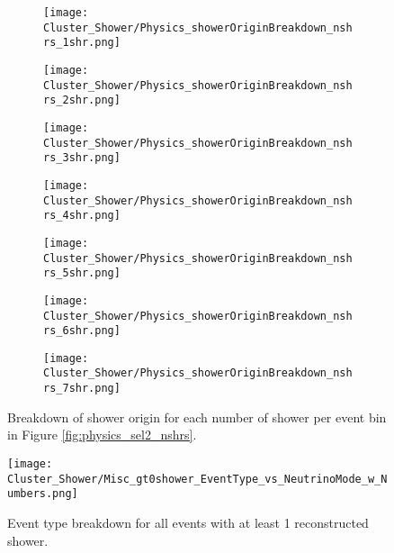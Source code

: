 \documentclass{article}
\begin{document}
\begin{figure}[t!]
\centering
  \begin{subfigure}[t]{0.25\textwidth}
    \centering
\texttt{[image: Cluster\_Shower/Physics\_showerOriginBreakdown\_nshrs\_1shr.png]}
  \caption{ }
  \end{subfigure} 
  \hspace{4mm}
  \begin{subfigure}[t]{0.25\textwidth}
    \centering
\texttt{[image: Cluster\_Shower/Physics\_showerOriginBreakdown\_nshrs\_2shr.png]}
  \caption{ }
  \end{subfigure} 
  \hspace{4mm}
  \begin{subfigure}[t]{0.25\textwidth}
    \centering
\texttt{[image: Cluster\_Shower/Physics\_showerOriginBreakdown\_nshrs\_3shr.png]}
  \caption{ }
  \end{subfigure} 
  \hspace{4mm}
  \begin{subfigure}[t]{0.25\textwidth}
    \centering
\texttt{[image: Cluster\_Shower/Physics\_showerOriginBreakdown\_nshrs\_4shr.png]}
  \caption{ }
  \end{subfigure} 
  \hspace{4mm}
  \begin{subfigure}[t]{0.25\textwidth}
    \centering
\texttt{[image: Cluster\_Shower/Physics\_showerOriginBreakdown\_nshrs\_5shr.png]}
  \caption{ }
  \end{subfigure} 
  \hspace{4mm}
  \begin{subfigure}[t]{0.25\textwidth}
    \centering
\texttt{[image: Cluster\_Shower/Physics\_showerOriginBreakdown\_nshrs\_6shr.png]}
  \caption{ }
  \end{subfigure} 
  \hspace{4mm}
  \begin{subfigure}[t]{0.25\textwidth}
    \centering
\texttt{[image: Cluster\_Shower/Physics\_showerOriginBreakdown\_nshrs\_7shr.png]}
  \caption{ }
  \end{subfigure} 
\caption{ Breakdown of shower origin for each number of shower per event bin in Figure \ref{fig:physics_sel2_nshrs}. }
\label{fig:physics_sel2_nshr_background_breakdown}
\end{figure}

\begin{figure}[h!]
\centering
\texttt{[image: Cluster\_Shower/Misc\_gt0shower\_EventType\_vs\_NeutrinoMode\_w\_Numbers.png]}
\caption{ Event type breakdown for all events with at least 1 reconstructed shower. }
\label{fig:physics_gt0shower_eventtype}
\end{figure}
\end{document}

